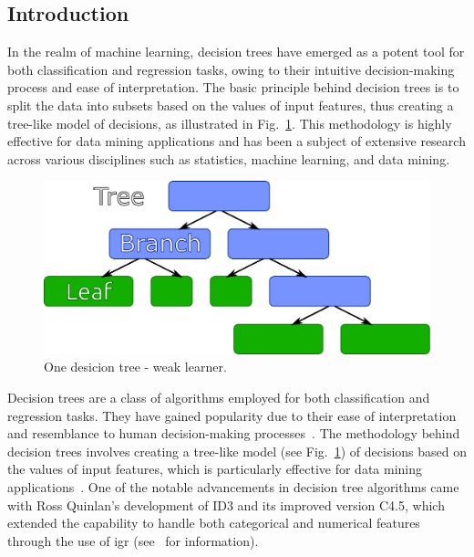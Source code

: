 \subsection{Introduction}

In the realm of machine learning, decision trees have emerged as a potent tool for both classification and regression tasks, owing to their intuitive decision-making process and ease of interpretation. The basic principle behind decision trees is to split the data into subsets based on the values of input features, thus creating a tree-like model of decisions, as illustrated in Fig.~\ref{fig:tree_scheme}. This methodology is highly effective for data mining applications and has been a subject of extensive research across various disciplines such as statistics, machine learning, and data mining.


\begin{figure}[htpb]
   \centering
    \includegraphics[width=0.5\linewidth]{images/boost/tree_scheme.pdf}
    \caption{One desicion tree - weak learner.}
    \label{fig:tree_scheme}
\end{figure}


Decision trees are a class of algorithms employed for both classification and regression tasks. They have gained popularity due to their ease of interpretation and resemblance to human decision-making processes~\cite{kotsiantis2013decision, song2015decision}. The methodology behind decision trees involves creating a tree-like model (see Fig.~\ref{fig:tree_scheme}) of decisions based on the values of input features, which is particularly effective for data mining applications~\cite{song2015decision}. 
One of the notable advancements in decision tree algorithms came with Ross Quinlan's development of ID3 and its improved version C4.5, which extended the capability to handle both categorical and numerical features through the use of 
\acrfull{igr} (see~\cite{mienye2019prediction} for information).


